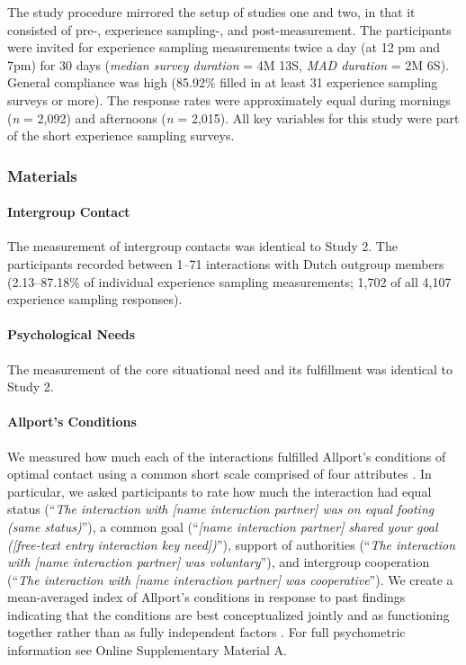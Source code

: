 The study procedure mirrored the setup of studies one and two, in that
it consisted of pre-, experience sampling-, and post-measurement. The
participants were invited for experience sampling measurements twice a
day (at 12 pm and 7pm) for 30 days (\textit{median survey duration} = 4M
13S, \textit{MAD duration} = 2M 6S). General compliance was high
(85.92\% filled in at least 31 experience sampling surveys or more). The
response rates were approximately equal during mornings (\textit{n} =
2,092) and afternoons (\textit{n} = 2,015). All key variables for this
study were part of the short experience sampling surveys.

\subsubsection{Materials}

\paragraph{Intergroup Contact}

The measurement of intergroup contacts was identical to Study 2. The
participants recorded between 1--71 interactions with Dutch outgroup
members (2.13--87.18\% of individual experience sampling measurements;
1,702 of all 4,107 experience sampling responses).

\paragraph{Psychological Needs}

The measurement of the core situational need and its fulfillment was
identical to Study 2.

\paragraph{Allport's Conditions}

We measured how much each of the interactions fulfilled Allport's
conditions of optimal contact using a common short scale comprised of
four attributes \citep{Islam1993, Voci2003, AlRamiah2012a, Dixon2005}.
In particular, we asked participants to rate how much the interaction
had equal status
(``\textit{The interaction with [name interaction partner] was on equal footing (same status)}''),
a common goal
(``\textit{[name interaction partner] shared your goal ([free-text entry interaction key need])}''),
support of authorities
(``\textit{The interaction with [name interaction partner] was voluntary}''),
and intergroup cooperation
(``\textit{The interaction with [name interaction partner] was cooperative}'').
We create a mean-averaged index of Allport's conditions in response to
past findings indicating that the conditions are best conceptualized
jointly and as functioning together rather than as fully independent
factors \citep[][, p. 766]{Pettigrew2006}. For full psychometric
information see Online Supplementary Material A.

